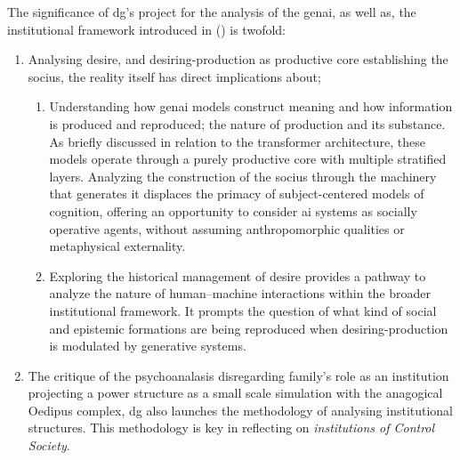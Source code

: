 The significance of \gls{dg}'s project for
the analysis of the \gls{genai}, as well as, the institutional framework
introduced in (\cite*{deleuze1992a}) is twofold:
\begin{enumerate}
	\item Analysing desire, and desiring-production as productive core
	      establishing the socius, the reality itself has direct implications about;
	      \begin{enumerate}
		      \item Understanding how \gls{genai} models construct meaning and how information is produced and reproduced; the nature of production and its substance. As briefly discussed in relation to the transformer architecture, these models operate through a purely productive core with multiple stratified layers. Analyzing the construction of the socius through the machinery that generates it displaces the primacy of subject-centered models of cognition, offering an opportunity to consider \gls{ai} systems as socially operative agents, without assuming anthropomorphic qualities or metaphysical externality.


		      \item Exploring the historical management of desire provides a pathway to analyze the nature of human–machine interactions within the broader institutional framework. It prompts the question of what kind of social and epistemic formations are being reproduced when desiring-production is modulated by generative systems.

	      \end{enumerate}

	\item The critique of the psychoanalasis disregarding family's role as an institution
	      projecting a power structure as a small scale simulation with the anagogical Oedipus complex, \gls{dg}
	      also launches the methodology of analysing institutional structures. This
	      methodology is key in reflecting on \textit{institutions of Control Society}.

\end{enumerate}

